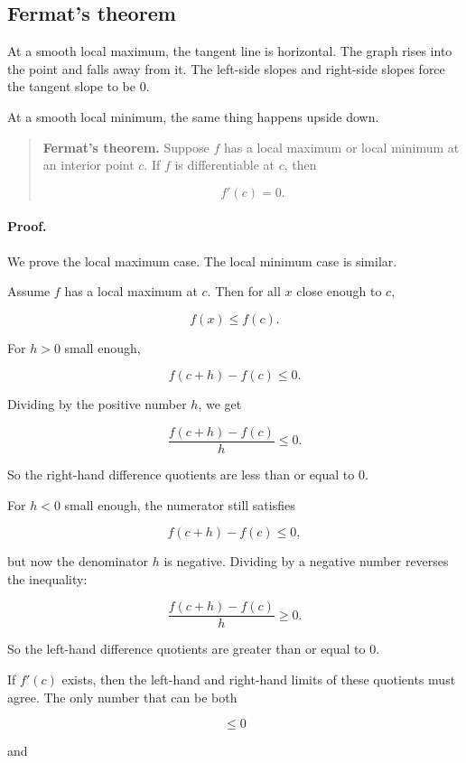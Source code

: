 \subsection{Fermat's theorem}
\label{subsec:fermats-theorem-extrema}

At a smooth local maximum, the tangent line is horizontal.  The graph rises into
the point and falls away from it.  The left-side slopes and right-side slopes force
the tangent slope to be \(0\).

At a smooth local minimum, the same thing happens upside down.

\begin{quote}
\textbf{Fermat's theorem.}
Suppose \(f\) has a local maximum or local minimum at an interior point \(c\).  If
\(f\) is differentiable at \(c\), then

\[
\boxed{f'(c)=0.}
\]
\end{quote}

\paragraph{Proof.}
We prove the local maximum case.  The local minimum case is similar.

Assume \(f\) has a local maximum at \(c\).  Then for all \(x\) close enough to \(c\),

\[
f(x)\le f(c).
\]

For \(h>0\) small enough,

\[
f(c+h)-f(c)\le 0.
\]

Dividing by the positive number \(h\), we get

\[
\frac{f(c+h)-f(c)}{h}\le 0.
\]

So the right-hand difference quotients are less than or equal to \(0\).

For \(h<0\) small enough, the numerator still satisfies

\[
f(c+h)-f(c)\le 0,
\]

but now the denominator \(h\) is negative.  Dividing by a negative number reverses
the inequality:

\[
\frac{f(c+h)-f(c)}{h}\ge 0.
\]

So the left-hand difference quotients are greater than or equal to \(0\).

If \(f'(c)\) exists, then the left-hand and right-hand limits of these quotients must
agree.  The only number that can be both

\[
\le 0
\]

and

